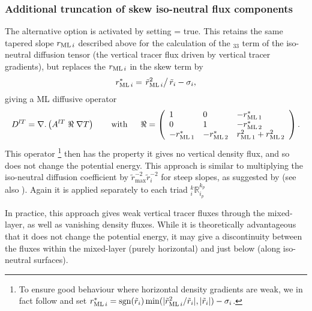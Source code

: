 \documentclass[../tex_main/NEMO_manual]{subfiles}
\begin{document}
\subsubsection{Additional truncation of skew iso-neutral flux components}
\label{subsec:Gerdes-taper}
The alternative option is activated by setting  =
  true. This retains the same tapered slope $r_{\mathrm{ML}\,i}$  described above for the
calculation of the $_{33}$ term of the iso-neutral diffusion tensor (the
vertical tracer flux driven by vertical tracer gradients), but
replaces the $r_{\mathrm{ML}\,i}$ in the skew term by
\begin{equation}
  \label{eq:rm*}
  r_{\mathrm{ML}\,i}^*=\left.\tilde{r}_{\mathrm{ML}\,i}^2\right/\tilde{r}_i-\sigma_i,
\end{equation}
giving a ML diffusive operator
\begin{equation} \label{eq:iso_tensor_ML2}
D^{lT}=\nabla {\rm {\bf .}}\left( {A^{lT}\;\Re \;\nabla T} \right) \qquad
\mbox{with}\quad \;\;\Re =\left( {{\begin{array}{*{20}c}
 1 \hfill & 0 \hfill & {-\rML[1]^*}\hfill \\
 0 \hfill & 1 \hfill & {-\rML[2]^*} \hfill \\
 {-\rML[1]^*}\hfill &   {-\rML[2]^*} \hfill & {\rML[1]^2+\rML[2]^2} \hfill \\
\end{array} }} \right).
\end{equation}
This operator
\footnote{To ensure good behaviour where horizontal density
  gradients are weak, we in fact follow \citet{Gerdes1991} and set
$r_{\mathrm{ML}\,i}^*=\mathrm{sgn}(\tilde{r}_i)\min(|\tilde{r}_{\mathrm{ML}\,i}^2/\tilde{r}_i|,|\tilde{r}_i|)-\sigma_i$.}
then has the property it gives no vertical density flux, and so does
not change the potential energy.
This approach is similar to multiplying the iso-neutral  diffusion
coefficient by $\tilde{r}_{\mathrm{max}}^{-2}\tilde{r}_i^{-2}$ for steep
slopes, as suggested by \citet{Gerdes1991} (see also \citet{Griffies_Bk04}).
Again it is applied separately to each triad $_i^k\mathbb{R}_{i_p}^{k_p}$

In practice, this approach gives weak vertical tracer fluxes through
the mixed-layer, as well as vanishing density fluxes. While it is
theoretically advantageous that it does not change the potential
energy, it may give a discontinuity between the
fluxes within the mixed-layer (purely horizontal) and just below (along
iso-neutral surfaces).
\end{document}
